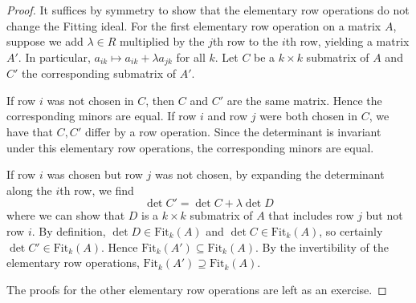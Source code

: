 \begin{proof}
	It suffices by symmetry to show that the elementary row operations do not change the Fitting ideal.
	For the first elementary row operation on a matrix \( A \), suppose we add \( \lambda \in R \) multiplied by the \( j \)th row to the \( i \)th row, yielding a matrix \( A' \).
	In particular, \( a_{ik} \mapsto a_{ik} + \lambda a_{jk} \) for all \( k \).
	Let \( C \) be a \( k \times k \) submatrix of \( A \) and \( C' \) the corresponding submatrix of \( A' \).

	If row \( i \) was not chosen in \( C \), then \( C \) and \( C' \) are the same matrix.
	Hence the corresponding minors are equal.
	If row \( i \) and row \( j \) were both chosen in \( C \), we have that \( C, C' \) differ by a row operation.
	Since the determinant is invariant under this elementary row operations, the corresponding minors are equal.

	If row \( i \) was chosen but row \( j \) was not chosen, by expanding the determinant along the \( i \)th row, we find
	\[
		\det C' = \det C + \lambda \det D
	\]
	where we can show that \( D \) is a \( k \times k \) submatrix of \( A \) that includes row \( j \) but not row \( i \).
	By definition, \( \det D \in \mathrm{Fit}_k(A) \) and \( \det C \in \mathrm{Fit}_k(A) \), so certainly \( \det C' \in \mathrm{Fit}_k(A) \).
	Hence \( \mathrm{Fit}_k(A') \subseteq \mathrm{Fit}_k(A) \).
	By the invertibility of the elementary row operations, \( \mathrm{Fit}_k(A') \supseteq \mathrm{Fit}_k(A) \).

	The proofs for the other elementary row operations are left as an exercise.
\end{proof}

